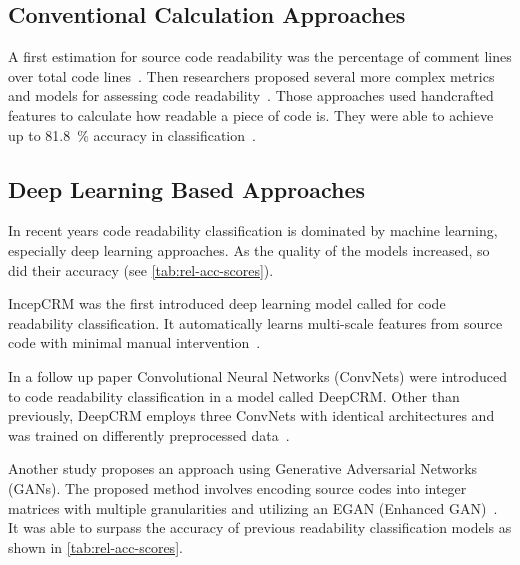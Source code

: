 \documentclass[%
class=scrreprt,
chapterprefix=false,%
open=right,%
twoside=false,%
paper=a4,%
logofile={Logo\_zentral\_farbig\_EN.png},%
thesistype=master,%
UKenglish,%
]{se2thesis}
\theoremstyle{definition}
\begin{document}
%	
%	
%	
	
\subsection{Conventional Calculation Approaches} \label{Classical Calculation Approaches}
	A first estimation for source code readability was the percentage of comment lines over total code lines~\cite{aggarwal2002integrated}. Then researchers proposed several more complex metrics and models for assessing code readability~\cite{buse2009learning, posnett2011simpler, dorn2012general, scalabrino2018comprehensive}.
	Those approaches used handcrafted features to calculate how readable a piece of code is. They were able to achieve up to 81.8~\% accuracy in classification~\cite{scalabrino2018comprehensive}.
	
\subsection{Deep Learning Based Approaches} \label{Deep Learning Based Approaches}
	In recent years code readability classification is dominated by machine learning, especially deep learning approaches. As the quality of the models increased, so did their accuracy (see \autoref{tab:rel-acc-scores}).
	
	IncepCRM was the first introduced deep learning model called for code readability classification. It automatically learns multi-scale features from source code with minimal manual intervention~\cite{mi2018inception}.
	
	In a follow up paper Convolutional Neural Networks (ConvNets) were introduced to code readability classification in a model called DeepCRM. Other than previously, DeepCRM employs three ConvNets with identical architectures and was trained on differently preprocessed data~\cite{mi2018improving}.
		
	Another study proposes an approach using Generative Adversarial Networks (GANs). The proposed method involves encoding source codes into integer matrices with multiple granularities and utilizing an EGAN (Enhanced GAN)~\cite{sharma2020egan}. It was able to surpass the accuracy of previous readability classification models as shown in \autoref{tab:rel-acc-scores}.
	
\end{document}

